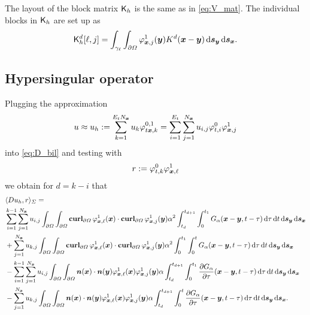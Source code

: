 \documentclass[a4paper,11pt]{article}
\begin{document}
The layout of the block matrix ${{\mathsf{K}}}_h$ is the same as in \eqref{eq:V_mat}. The individual blocks in ${{\mathsf{K}}}_h$ are set up as
\begin{equation*}
  {\ensuremath{{\mathsf{K}}}}^d_h[ \ell , j ] = \int_{\gamma_\ell} \int_{\partial\Omega} \varphi^1_{{{\bm{x}}},j}({{\bm{y}}}) K^d({{\bm{x}}}-{{\bm{y}}}) \,{\mathrm{d}}{{\bm{s}}}_{{\bm{y}}} \,{\mathrm{d}}{{\bm{s}}}_{{\bm{x}}}.
\end{equation*}

\subsection{Hypersingular operator}

Plugging the approximation
\begin{equation*}
 u \approx u_h := \sum_{k=1}^{E_t N_{{\bm{x}}}} u_k \varphi^{0,1}_{t{{\bm{x}}},k} = \sum_{i=1}^{E_t} \sum_{j=1}^{N_{{\bm{x}}}} u_{i,j} \varphi^0_{t,i} \varphi^1_{{{\bm{x}}},j}
\end{equation*}
into \eqref{eq:D_bil} and testing with
\begin{equation*}
  r := \varphi^0_{t,k} \varphi^1_{{{\bm{x}}},\ell}
\end{equation*}
we obtain for $d=k-i$ that
\begin{align*}
  &\langle Du_h, r \rangle_\Sigma = \\ 
  &\sum_{i=1}^{k-1} \sum_{j=1}^{N_{{\bm{x}}}} u_{i,j}\int_{\partial\Omega} \int_{\partial\Omega} \operatorname{\mathbf{curl}}_{\partial\Omega} \varphi^1_{{{\bm{x}}},\ell}({{\bm{x}}}) \cdot \operatorname{\mathbf{curl}}_{\partial\Omega} \varphi^1_{{{\bm{x}}},j}({{\bm{y}}}) \alpha^2 \int_{t_{d}}^{t_{d+1}} \int_{0}^{t_1} G_\alpha({{\bm{x}}}-{{\bm{y}}},t-\tau) \,{\mathrm{d}}\tau \,{\mathrm{d}} t \,{\mathrm{d}}{{\bm{s}}}_{{\bm{y}}} \,{\mathrm{d}}{{\bm{s}}}_{{\bm{x}}} \\
    &+\sum_{j=1}^{N_{{\bm{x}}}} u_{k,j}\int_{\partial\Omega} \int_{\partial\Omega} \operatorname{\mathbf{curl}}_{\partial\Omega} \varphi^1_{{{\bm{x}}},\ell}({{\bm{x}}}) \cdot \operatorname{\mathbf{curl}}_{\partial\Omega} \varphi^1_{{{\bm{x}}},j}({{\bm{y}}}) \alpha^2 \int_{0}^{t_1} \int_{0}^{t} G_\alpha({{\bm{x}}}-{{\bm{y}}},t-\tau) \,{\mathrm{d}}\tau \,{\mathrm{d}} t \,{\mathrm{d}}{{\bm{s}}}_{{\bm{y}}} \,{\mathrm{d}}{{\bm{s}}}_{{\bm{x}}} \\
  &- \sum_{i=1}^{k-1} \sum_{j=1}^{N_{{\bm{x}}}} u_{i,j} \int_{\partial\Omega} \int_{\partial\Omega} {{\bm{n}}}({{\bm{x}}}) \cdot {\ensuremath{{\bm{n}}}}({{\bm{y}}}) \varphi^1_{{{\bm{x}}},\ell}({{\bm{x}}}) \varphi^1_{{{\bm{x}}},j}({{\bm{y}}}) \alpha \int_{t_d}^{t_{d+1}} \int_0^{t_1} \frac{\partial G_\alpha}{\partial \tau}({{\bm{x}}}-{{\bm{y}}},t-\tau) \,{\mathrm{d}}\tau \,{\mathrm{d}} t \,{\mathrm{d}}{{\bm{s}}}_{{\bm{y}}} \,{\mathrm{d}}{{\bm{s}}}_{{\bm{x}}} \\
    &- \sum_{j=1}^{N_{{\bm{x}}}} u_{k,j} \int_{\partial\Omega} \int_{\partial\Omega} {{\bm{n}}}({{\bm{x}}}) \cdot {\ensuremath{{\bm{n}}}}({{\bm{y}}}) \varphi^1_{{{\bm{x}}},\ell}({{\bm{x}}}) \varphi^1_{{{\bm{x}}},j}({{\bm{y}}}) \alpha \int_{t_d}^{t_{d+1}} \int_0^{t} \frac{\partial G_\alpha}{\partial \tau}({{\bm{x}}}-{{\bm{y}}},t-\tau) \,{\mathrm{d}}\tau \,{\mathrm{d}} t \,{\mathrm{d}}{{\bm{s}}}_{{\bm{y}}} \,{\mathrm{d}}{{\bm{s}}}_{{\bm{x}}}.
\end{align*}
\end{document}
